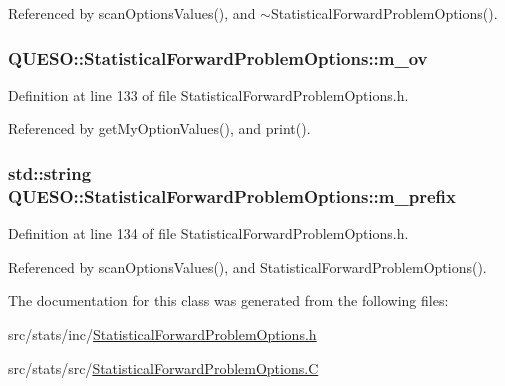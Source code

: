 Referenced by scan\-Options\-Values(), and $\sim$\-Statistical\-Forward\-Problem\-Options().

\hypertarget{class_q_u_e_s_o_1_1_statistical_forward_problem_options_a87ad4acd32801ea3edd5e65ffb093dbf}{
\subsubsection[{m\-\_\-ov}]{ Q\-U\-E\-S\-O\-::\-Statistical\-Forward\-Problem\-Options\-::m\-\_\-ov}}\label{class_q_u_e_s_o_1_1_statistical_forward_problem_options_a87ad4acd32801ea3edd5e65ffb093dbf}


Definition at line 133 of file Statistical\-Forward\-Problem\-Options.\-h.



Referenced by get\-My\-Option\-Values(), and print().

\hypertarget{class_q_u_e_s_o_1_1_statistical_forward_problem_options_adc3ea162cb9889b19128686aa657ab30}{
\subsubsection[{m\-\_\-prefix}]{\setlength{\rightskip}{0pt plus 5cm}std\-::string Q\-U\-E\-S\-O\-::\-Statistical\-Forward\-Problem\-Options\-::m\-\_\-prefix}}\label{class_q_u_e_s_o_1_1_statistical_forward_problem_options_adc3ea162cb9889b19128686aa657ab30}


Definition at line 134 of file Statistical\-Forward\-Problem\-Options.\-h.



Referenced by scan\-Options\-Values(), and Statistical\-Forward\-Problem\-Options().



The documentation for this class was generated from the following files\-:\begin{DoxyCompactItemize}
\item 
src/stats/inc/\hyperlink{_statistical_forward_problem_options_8h}{Statistical\-Forward\-Problem\-Options.\-h}\item 
src/stats/src/\hyperlink{_statistical_forward_problem_options_8_c}{Statistical\-Forward\-Problem\-Options.\-C}\end{DoxyCompactItemize}
